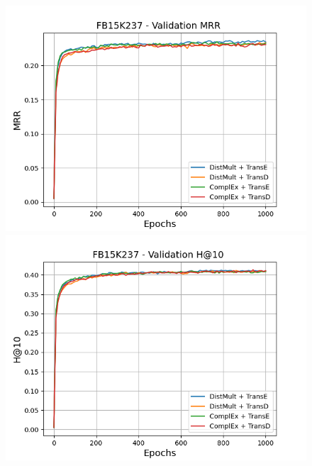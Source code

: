 \begin{figure}[H]
    \centering
    \begin{minipage}{.5\textwidth}
      \centering
      \includegraphics[width=\linewidth]{figures/results/gan_train/not_pretrained/uncertainty/max_distribution/entropy/fb15k237/1k_epochs/uncertainty_fb15k237_mrrs.png}
    \end{minipage}%
    \begin{minipage}{.5\textwidth}
      \centering
      \includegraphics[width=\linewidth]{figures/results/gan_train/not_pretrained/uncertainty/max_distribution/entropy/fb15k237/1k_epochs/uncertainty_fb15k237_hit10.png}
    \end{minipage}
    

\end{figure}
